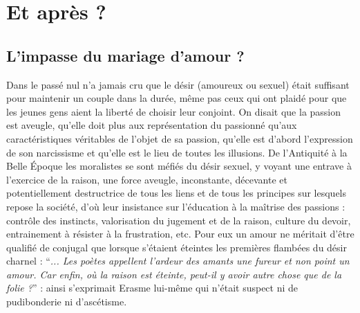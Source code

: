 

\part{Et après ?}

 \chapter{L'impasse du mariage d'amour ?}
 

 
 
Dans le passé nul n'a jamais cru que le désir (amoureux ou sexuel) était suffisant pour maintenir un couple dans la durée, même pas ceux qui ont plaidé pour que les jeunes gens aient la liberté de choisir leur conjoint. On disait que la passion est aveugle, qu'elle doit plus aux représentation du passionné qu'aux caractéristiques véritables de l'objet de sa passion, qu'elle est d'abord l'expression de son narcissisme et qu'elle est le lieu de toutes les illusions. De l'Antiquité à la Belle Époque les moralistes se sont méfiés du désir sexuel, y voyant une entrave à l'exercice de la raison, une force aveugle, inconstante, décevante et potentiellement destructrice de tous les liens et de tous les principes sur lesquels repose la société, d'où leur insistance sur l'éducation à la maîtrise des passions : contrôle des instincts, valorisation du jugement et de la raison, culture du devoir, entrainement à résister à la frustration, etc. Pour eux un amour ne méritait d'être qualifié de conjugal que lorsque s'étaient éteintes les premières flambées du désir charnel : \enquote{\emph{... Les poètes appellent l'ardeur des amants une fureur et non point un amour. Car enfin, où la raison est éteinte, peut-il y avoir autre chose que de la folie ?}} : ainsi s'exprimait Erasme lui-même qui n'était suspect ni de pudibonderie ni d'ascétisme.


